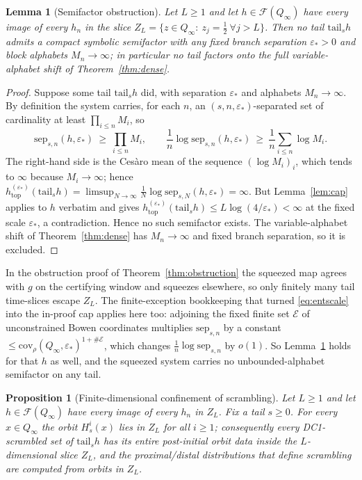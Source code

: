 \documentclass[11pt]{article}
\newtheorem{lemma}[theorem]{Lemma}
\newtheorem{proposition}[theorem]{Proposition}
\newcommand{\Q}{Q_\infty}
\newcommand{\F}{\mathcal{F}}
\begin{document}
\begin{lemma}[Semifactor obstruction]\label{lem:semifactor}
Let $L\ge1$ and let $h\in\F(\Q)$ have every image of every $h_n$ in the slice
$Z_L=\{z\in\Q:\ z_j=\tfrac12\ \forall j>L\}$.  Then no tail $\mathrm{tail}_sh$ admits a
compact symbolic semifactor with any fixed branch separation $\varepsilon_*>0$ and block
alphabets $M_n\to\infty$; in particular no tail factors onto the full variable-alphabet
shift of Theorem~\ref{thm:dense}.
\end{lemma}

\begin{proof}
Suppose some tail $\mathrm{tail}_sh$ did, with separation $\varepsilon_*$ and alphabets
$M_n\to\infty$.  By definition the system carries, for each $n$, an
$(s,n,\varepsilon_*)$-separated set of cardinality at least $\prod_{i\le n}M_i$, so
\[
\mathrm{sep}_{s,n}(h,\varepsilon_*)\ \ge\ \prod_{i\le n}M_i,
\qquad
\frac{1}{n}\log\mathrm{sep}_{s,n}(h,\varepsilon_*)\ \ge\
\frac{1}{n}\sum_{i\le n}\log M_i .
\]
The right-hand side is the Cesàro mean of the sequence $(\log M_i)_i$, which tends to
$\infty$ because $M_i\to\infty$; hence
$h^{(\varepsilon_*)}_{\mathrm{top}}(\mathrm{tail}_sh)
=\limsup_{N\to\infty}\frac1N\log\mathrm{sep}_{s,N}(h,\varepsilon_*)=\infty$.
But Lemma~\ref{lem:cap} applies to $h$ verbatim and gives
$h^{(\varepsilon_*)}_{\mathrm{top}}(\mathrm{tail}_sh)\le L\log(4/\varepsilon_*)<\infty$
at the fixed scale $\varepsilon_*$, a contradiction.  Hence no such semifactor exists.
The variable-alphabet shift of Theorem~\ref{thm:dense} has $M_n\to\infty$ and fixed branch
separation, so it is excluded.
\end{proof}

In the obstruction proof of Theorem~\ref{thm:obstruction} the squeezed map agrees with
$g$ on the certifying window and squeezes elsewhere, so only finitely many tail
time-slices escape $Z_L$.  The finite-exception bookkeeping that turned
\eqref{eq:entscale} into the in-proof cap applies here too: adjoining the fixed finite set
$\mathcal E$ of unconstrained Bowen coordinates multiplies $\mathrm{sep}_{s,n}$ by a
constant $\le\mathrm{cov}_\rho(\Q,\varepsilon_*)^{1+\#\mathcal E}$, which changes
$\frac1n\log\mathrm{sep}_{s,n}$ by $o(1)$.  So Lemma~\ref{lem:semifactor} holds for that
$h$ as well, and the squeezed system carries no unbounded-alphabet semifactor on any tail.

\begin{proposition}[Finite-dimensional confinement of scrambling]\label{prop:confine}
Let $L\ge1$ and let $h\in\F(\Q)$ have every image of every $h_n$ in $Z_L$.  Fix a tail
$s\ge0$.  For every $x\in\Q$ the orbit $H^i_s(x)$ lies in $Z_L$ for all $i\ge1$;
consequently every DC1-scrambled set of $\mathrm{tail}_sh$ has its entire post-initial
orbit data inside the $L$-dimensional slice $Z_L$, and the proximal/distal distributions
that define scrambling are computed from orbits in $Z_L$.
\end{proposition}
\end{document}
